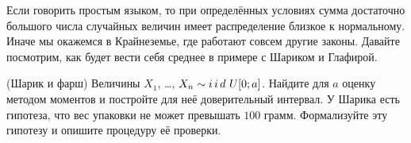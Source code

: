 \documentclass[12pt, a4paper, oneside]{article}
\begin{document}
Если говорить простым языком, то при определённых условиях сумма достаточно большого числа случайных величин имеет распределение близкое к нормальному.  Иначе мы окажемся в Крайнеземье, где работают совсем другие законы. Давайте посмотрим, как будет вести себя среднее в примере с Шариком и Глафирой.

\begin{problem}{(Шарик и фарш)}
Величины $X_1$, \ldots, $X_n \sim i\,i\,d\,\, U[0;a]$. Найдите для $a$ оценку методом моментов и постройте для неё доверительный интервал. У Шарика есть гипотеза, что вес упаковки не может превышать $100$ грамм. Формализуйте эту гипотезу и опишите процедуру её проверки. 
\end{problem}
\end{document}
